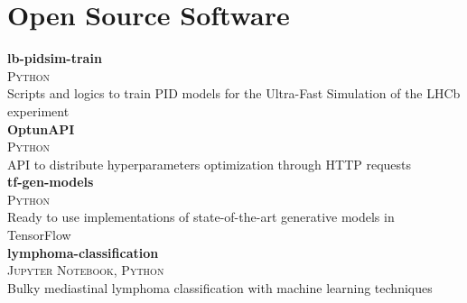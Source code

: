 \newcommand{\pkgname}[1]
  {\normalsize \color{hlcolor-0} \textbf{#1}}

\newcommand{\pkginfo}[1]
  {\small \color{hlcolor-1} \textsc{#1}}
  
\newcommand{\pkgdesc}[1]
  {\normalsize \color{maincolor} {#1}}


\section*{Open Source Software}
\begin{cvcontent}
  \pkgname{lb-pidsim-train} \hfill
  \\
  \pkginfo{Python}\\
  \pkgdesc{Scripts and logics to train PID models for the Ultra-Fast Simulation of the LHCb experiment}
  \\ [3mm]
  \pkgname{OptunAPI} \hfill
  \\
  \pkginfo{Python}\\
  \pkgdesc{API to distribute hyperparameters optimization through HTTP requests}
  \\ [3mm]
  \pkgname{tf-gen-models} \hfill
  \\
  \pkginfo{Python}\\
  \pkgdesc{Ready to use implementations of state-of-the-art generative models in TensorFlow}
  \\ [3mm]
  \pkgname{lymphoma-classification} \hfill
  \\
  \pkginfo{Jupyter Notebook, Python}\\
  \pkgdesc{Bulky mediastinal lymphoma classification with machine learning techniques}
\end{cvcontent}